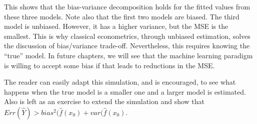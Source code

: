 This shows that the bias-variance decomposition holds for the fitted
values from these three models. Note also that the first two models are
biased. The third model is unbiased. However, it has a higher variance,
but the MSE is the smallest. This is why classical econometrics, through
unbiased estimation, solves the discussion of bias/variance trade-off.
Nevertheless, this requires knowing the ``true'' model. In future
chapters, we will see that the machine learning paradigm is willing to
accept some bias if that leads to reductions in the MSE.

The reader can easily adapt this simulation, and is encouraged, to see
what happens when the true model is a smaller one and a larger model is
estimated. Also is left as an exercise to extend the simulation and show
that  $Err(\hat{Y})>bias^{2}(\hat{f}(x_{0})+var(\hat{f}(x_{0})$.

